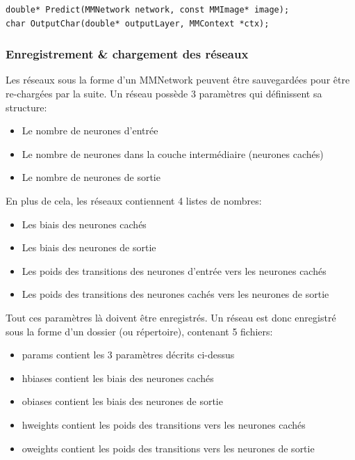 \documentclass{article}
\begin{document}
\begin{lstlisting}
double*	Predict(MMNetwork network, const MMImage* image);
char OutputChar(double* outputLayer, MMContext *ctx);
\end{lstlisting}




\subsubsection{Enregistrement \& chargement des réseaux}


Les réseaux sous la forme d’un MMNetwork peuvent être sauvegardées pour être re-chargées par la suite. Un réseau possède 3 paramètres qui définissent sa structure:
\begin{itemize}
	\item Le nombre de neurones d’entrée
	\item Le nombre de neurones dans la couche intermédiaire (neurones cachés)
	\item Le nombre de neurones de sortie
\end{itemize}

En plus de cela, les réseaux contiennent 4 listes de nombres:
\begin{itemize}
	\item Les biais des neurones cachés
	\item Les biais des neurones de sortie
	\item Les poids des transitions des neurones d’entrée vers les neurones cachés
	\item Les poids des transitions des neurones cachés vers les neurones de sortie
\end{itemize}


Tout ces paramètres là doivent être enregistrés. Un réseau est donc enregistré sous la forme d’un dossier (ou répertoire), contenant 5 fichiers:
\begin{itemize}
	\item{params\hphantom{..}} contient les 3 paramètres décrits ci-dessus
	\item{hbiases\hphantom{..}} contient les biais des neurones cachés
	\item{obiases\hphantom{..}} contient les biais des neurones de sortie
	\item{hweights\hphantom{}} contient les poids des transitions vers les neurones cachés
	\item{oweights\hphantom{}} contient les poids des transitions vers les neurones de sortie
\end{itemize}
\end{document}
